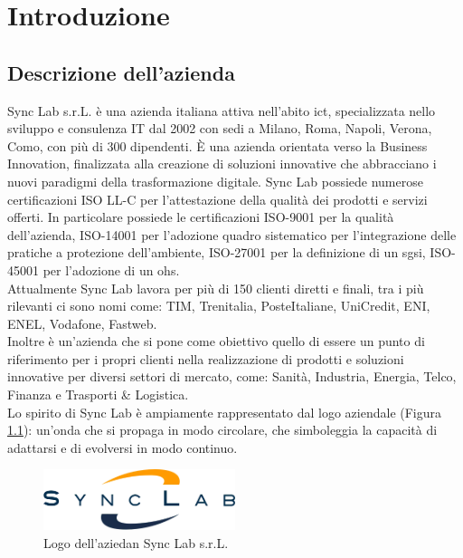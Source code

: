 \chapter{Introduzione}
\label{cap:introduzione}
\section{Descrizione dell'azienda}
Sync Lab s.r.L. è una azienda italiana attiva nell'abito \gls{ict}{}, specializzata nello sviluppo e consulenza IT dal 2002 con sedi a 
Milano, Roma, Napoli, Verona, Como, con più di 300 dipendenti. È una azienda orientata verso la \gls{Business Innovation}{}, finalizzata alla 
creazione di soluzioni innovative che abbracciano i nuovi paradigmi della trasformazione digitale.
Sync Lab possiede numerose certificazioni ISO LL-C per l'attestazione della 
qualità dei prodotti e servizi offerti. In particolare possiede le certificazioni 
ISO-9001 per la qualità dell'azienda, ISO-14001 per l'adozione quadro sistematico per l'integrazione delle pratiche a protezione dell'ambiente, ISO-27001 per la definizione di un \gls{sgsi}{}, ISO-45001 per l'adozione di un \gls{ohs}{}.
\\
Attualmente Sync Lab  lavora per più di 150 clienti diretti e finali, tra i più rilevanti ci sono nomi come: TIM, Trenitalia, PosteItaliane, UniCredit, ENI, ENEL, Vodafone, Fastweb.
\\
Inoltre è un'azienda che si pone come obiettivo quello di essere un punto di riferimento per i propri clienti nella realizzazione di prodotti e soluzioni innovative per diversi settori di mercato, come: Sanità, Industria, Energia, Telco, Finanza e Trasporti \& Logistica.\\
Lo spirito di Sync Lab è ampiamente rappresentato dal logo aziendale (Figura \ref{figure:logo_azienda}): un'onda che si propaga in modo circolare, che simboleggia la capacità di adattarsi e di evolversi in modo continuo.\\
\begin{figure}[htbp]  
\centering
    \includegraphics[width=0.5\textwidth]{images/introduzione/logo_azienda.png}
    \caption{Logo dell'aziedan Sync Lab s.r.L.}
    \label{figure:logo_azienda}
\end{figure}
\pagebreak
